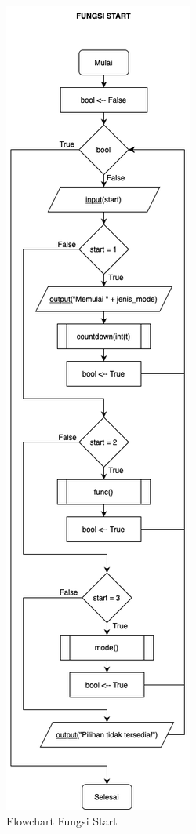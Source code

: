\documentclass[conference]{IEEEtran}
\begin{document}
\begin{figure}[htbp]
    \centering
    \def\svgwidth{\columnwidth}
    \centerline{\includegraphics[scale=0.4]{Start.png}}
    \caption{Flowchart Fungsi Start}
    \label{fig4}
\end{figure}
\end{document}
